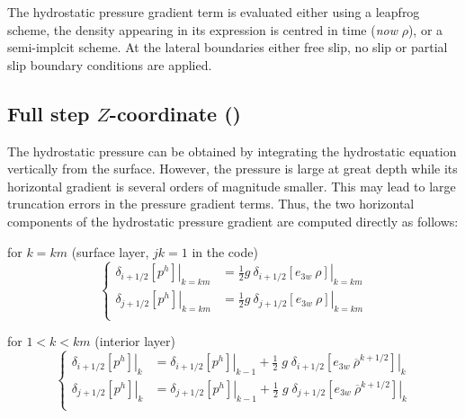 \documentclass[../main/NEMO_manual]{subfiles}
\begin{document}
The hydrostatic pressure gradient term is evaluated either using a leapfrog scheme,
\ie the density appearing in its expression is centred in time (\emph{now} $\rho$),
or a semi-implcit scheme.
At the lateral boundaries either free slip, no slip or partial slip boundary conditions are applied.

\subsection{Full step $Z$-coordinate (\protect{})}
\label{subsec:DYN_hpg_zco}

The hydrostatic pressure can be obtained by integrating the hydrostatic equation vertically from the surface.
However, the pressure is large at great depth while its horizontal gradient is several orders of magnitude smaller.
This may lead to large truncation errors in the pressure gradient terms.
Thus, the two horizontal components of the hydrostatic pressure gradient are computed directly as follows:

for $k=km$ (surface layer, $jk=1$ in the code)
\begin{equation}
  \label{eq:dynhpg_zco_surf}
  \left\{
    \begin{aligned}
      \left. \delta_{i+1/2} \left[  p^h 			 \right] \right|_{k=km}
      &= \frac{1}{2} g \ 	\left. \delta_{i+1/2} \left[  e_{3w} \ \rho \right] \right|_{k=km}   \\
      \left. \delta_{j+1/2} \left[  p^h  			 \right] \right|_{k=km}
      &= \frac{1}{2} g \ 	\left. \delta_{j+1/2} \left[  e_{3w} \ \rho \right] \right|_{k=km}   \\
    \end{aligned}
  \right.
\end{equation} 

for $1<k<km$ (interior layer)
\begin{equation}
  \label{eq:dynhpg_zco}
  \left\{
    \begin{aligned}
      \left. \delta_{i+1/2} \left[  p^h 			 \right] \right|_{k}
      &=					\left. \delta_{i+1/2} \left[  p^h 			 \right] \right|_{k-1}
      +    \frac{1}{2}\;g\;	\left. \delta_{i+1/2} \left[  e_{3w} \ \overline {\rho}^{k+1/2} \right] \right|_{k}   \\
      \left. \delta_{j+1/2} \left[  p^h  			 \right] \right|_{k}
      &=     				\left. \delta_{j+1/2} \left[  p^h  			 \right] \right|_{k-1}
      +    \frac{1}{2}\;g\;	\left. \delta_{j+1/2} \left[  e_{3w} \ \overline {\rho}^{k+1/2} \right] \right|_{k}   \\
    \end{aligned}
  \right.
\end{equation} 
\end{document}
